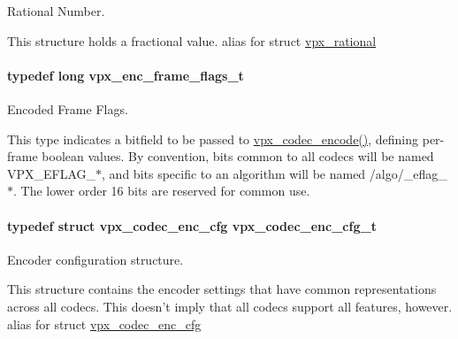 \-Rational \-Number. 

\-This structure holds a fractional value. alias for struct \hyperlink{structvpx__rational}{vpx\-\_\-rational} \hypertarget{group__encoder_ga99e4a3c966f0de19fe1aa626bd860366}{
\paragraph[{vpx\-\_\-enc\-\_\-frame\-\_\-flags\-\_\-t}]{\setlength{\rightskip}{0pt plus 5cm}typedef long {\bf vpx\-\_\-enc\-\_\-frame\-\_\-flags\-\_\-t}}}\label{group__encoder_ga99e4a3c966f0de19fe1aa626bd860366}


\-Encoded \-Frame \-Flags. 

\-This type indicates a bitfield to be passed to \hyperlink{group__encoder_gaf990542e2aeb389f05fae3e9c7803639}{vpx\-\_\-codec\-\_\-encode()}, defining per-\/frame boolean values. \-By convention, bits common to all codecs will be named \-V\-P\-X\-\_\-\-E\-F\-L\-A\-G\-\_\-$\ast$, and bits specific to an algorithm will be named /algo/\-\_\-eflag\-\_\-$\ast$. \-The lower order 16 bits are reserved for common use. \hypertarget{group__encoder_ga946236c809e493b31a815d82db1e59db}{
\paragraph[{vpx\-\_\-codec\-\_\-enc\-\_\-cfg\-\_\-t}]{\setlength{\rightskip}{0pt plus 5cm}typedef struct {\bf vpx\-\_\-codec\-\_\-enc\-\_\-cfg}  {\bf vpx\-\_\-codec\-\_\-enc\-\_\-cfg\-\_\-t}}}\label{group__encoder_ga946236c809e493b31a815d82db1e59db}


\-Encoder configuration structure. 

\-This structure contains the encoder settings that have common representations across all codecs. \-This doesn't imply that all codecs support all features, however. alias for struct \hyperlink{structvpx__codec__enc__cfg}{vpx\-\_\-codec\-\_\-enc\-\_\-cfg} 

